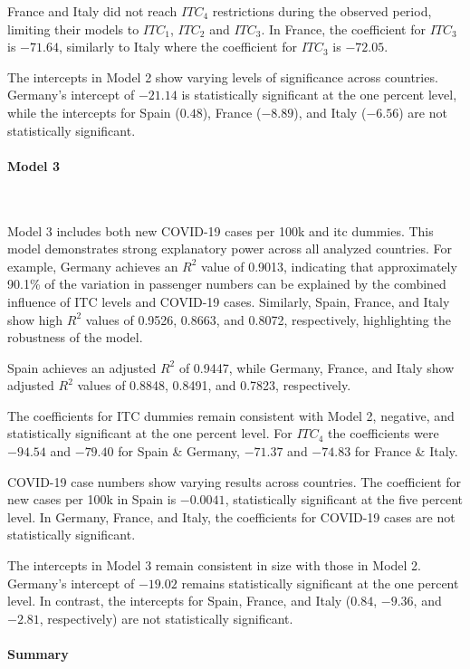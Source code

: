 \documentclass[12pt,onehalfspacing,headsepline,oneside,openright,a4paper, fleqn]{report}
\begin{document}
France and Italy did not reach $ITC_4$ restrictions during the observed period, limiting their models to $ITC_1$, $ITC_2$ and $ITC_3$. In France, the coefficient for $ITC_3$ is $-71.64$, similarly to Italy where the coefficient for $ITC_3$ is $-72.05$.

The intercepts in Model 2 show varying levels of significance across countries. Germany’s intercept of $-21.14$ is statistically significant at the one percent level, while the intercepts for Spain ($0.48$), France ($-8.89$), and Italy ($-6.56$) are not statistically significant.

\paragraph{Model 3}
\

Model 3 includes both new COVID-19 cases per 100k and \gls{itc} dummies. This model demonstrates strong explanatory power across all analyzed countries. For example, Germany achieves an $R^2$ value of 0.9013, indicating that approximately 90.1\% of the variation in passenger numbers can be explained by the combined influence of ITC levels and COVID-19 cases. Similarly, Spain, France, and Italy show high $R^2$ values of 0.9526, 0.8663, and 0.8072, respectively, highlighting the robustness of the model. 

Spain achieves an adjusted $R^2$ of 0.9447, while Germany, France, and Italy show adjusted $R^2$ values of 0.8848, 0.8491, and 0.7823, respectively.

The coefficients for ITC dummies remain consistent with Model 2, negative, and statistically significant at the one percent level. For $ITC_4$ the coefficients were $-94.54$ and $-79.40$ for Spain \& Germany, $-71.37$ and $-74.83$ for France \& Italy.

COVID-19 case numbers show varying results across countries. The coefficient for new cases per 100k in Spain is $-0.0041$, statistically significant at the five percent level. In Germany, France, and Italy, the coefficients for COVID-19 cases are not statistically significant.

The intercepts in Model 3 remain consistent in size with those in Model 2. Germany’s intercept of $-19.02$ remains statistically significant at the one percent level. In contrast, the intercepts for Spain, France, and Italy ($0.84$, $-9.36$, and $-2.81$, respectively) are not statistically significant.

\newpage

\paragraph{Summary}
\
\end{document}
